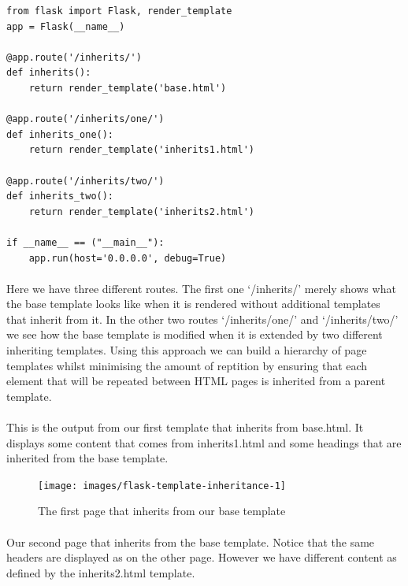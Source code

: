 \documentclass[12pt, a4paper, oneside]{book}
\begin{document}
{\begin{lstlisting}
from flask import Flask, render_template
app = Flask(__name__)

@app.route('/inherits/')
def inherits():
    return render_template('base.html')

@app.route('/inherits/one/')
def inherits_one():
    return render_template('inherits1.html')

@app.route('/inherits/two/')
def inherits_two():
    return render_template('inherits2.html')

if __name__ == ("__main__"):
    app.run(host='0.0.0.0', debug=True)
\end{lstlisting}

\paragraph{} Here we have three different routes. The first one `/inherits/' merely shows what the base template looks like when it is rendered without additional templates that inherit from it. In the other two routes `/inherits/one/' and `/inherits/two/' we see how the base template is modified when it is extended by two different inheriting templates. Using this approach we can build a hierarchy of page templates whilst minimising the amount of reptition by ensuring that each element that will be repeated between HTML pages is inherited from a parent template.

\paragraph{} This is the output from our first template that inherits from base.html. It displays some content that comes from inherits1.html and some headings that are inherited from the base template.

\begin{figure}[H]
\centering
\texttt{[image: images/flask-template-inheritance-1]}
\caption{The first page that inherits from our base template}
\label{fig:flask-template-inheritance-1}
\end{figure}

\paragraph{} Our second page that inherits from the base template. Notice that the same headers are displayed as on the other page. However we have different content as defined by the inherits2.html template.

}
\end{document}

